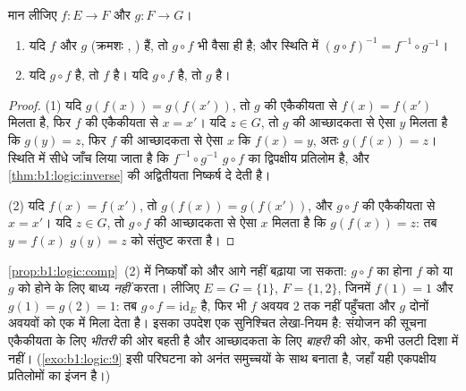 \begin{proposition}[संयोजन और तीनों गुणधर्म]\label{prop:b1:logic:comp}
मान लीजिए $f \colon E \to F$ और $g \colon F \to G$।
\begin{enumerate}
  \item यदि $f$ और $g$  (क्रमशः , ) हैं, तो $g
  \circ f$ भी वैसा ही है; और  स्थिति में $(g \circ f)^{-1} =
  f^{-1} \circ g^{-1}$।
  \item यदि $g \circ f$  है, तो $f$  है। यदि $g \circ f$ 
  है, तो $g$  है।
\end{enumerate}
\end{proposition}

\begin{proof}
(1) यदि $g(f(x)) = g(f(x'))$, तो $g$ की एकैकीयता से $f(x) = f(x')$ मिलता है,
फिर $f$ की एकैकीयता से $x = x'$। यदि $z \in G$, तो $g$ की आच्छादकता से ऐसा
$y$ मिलता है कि $g(y) = z$, फिर $f$ की आच्छादकता से ऐसा $x$ कि $f(x) = y$,
अतः $g(f(x)) = z$।  स्थिति में सीधे जाँच लिया जाता है कि
$f^{-1} \circ g^{-1}$ $g \circ f$ का द्विपक्षीय प्रतिलोम है, और
\cref{thm:b1:logic:inverse} की अद्वितीयता निष्कर्ष दे देती है।

(2) यदि $f(x) = f(x')$, तो $g(f(x)) = g(f(x'))$, और $g \circ f$ की एकैकीयता
से $x = x'$। यदि $z \in G$, तो $g \circ f$ की आच्छादकता से ऐसा $x$ मिलता है
कि $g(f(x)) = z$: तब $y = f(x)$ $g(y) = z$ को संतुष्ट करता है।
\end{proof}

\begin{example}[बिंदु (2) तीक्ष्ण है]\label{ex:b1:logic:compsharp}
\cref{prop:b1:logic:comp}~(2) में निष्कर्षों को और आगे नहीं बढ़ाया जा सकता:
$g \circ f$ का  होना $f$ को  या $g$ को  होने के लिए
बाध्य \emph{नहीं} करता। लीजिए $E = G = \{1\}$, $F = \{1, 2\}$, जिनमें $f(1)
= 1$ और $g(1) = g(2) = 1$: तब $g \circ f = \mathrm{id}_E$  है,
फिर भी $f$ अवयव $2$ तक नहीं पहुँचता और $g$ दोनों अवयवों को एक में मिला देता
है। इसका उपदेश एक सुनिश्चित लेखा-नियम है: संयोजन की सूचना एकैकीयता के लिए
\emph{भीतरी}  की ओर बहती है और आच्छादकता के लिए \emph{बाहरी}
 की ओर, कभी उलटी दिशा में नहीं। (\cref{exo:b1:logic:9} इसी
परिघटना को अनंत समुच्चयों के साथ बनाता है, जहाँ यही एकपक्षीय प्रतिलोमों का
इंजन है।)
\end{example}

